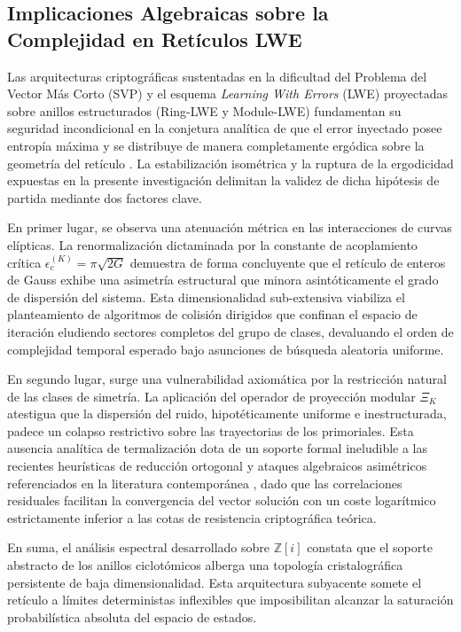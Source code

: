 \documentclass{article}
\numberwithin{equation}{section}
\theoremstyle{plain}
\theoremstyle{definition}
\begin{document}
\subsection{Implicaciones Algebraicas sobre la Complejidad en Retículos LWE}

Las arquitecturas criptográficas sustentadas en la dificultad del Problema del Vector Más Corto (SVP) y el esquema \textit{Learning With Errors} (LWE) proyectadas sobre anillos estructurados (Ring-LWE y Module-LWE) fundamentan su seguridad incondicional en la conjetura analítica de que el error inyectado posee entropía máxima y se distribuye de manera completamente ergódica sobre la geometría del retículo \cite{Peikert2009, Regev2009}. La estabilización isométrica y la ruptura de la ergodicidad expuestas en la presente investigación delimitan la validez de dicha hipótesis de partida mediante dos factores clave.

En primer lugar, se observa una atenuación métrica en las interacciones de curvas elípticas. La renormalización dictaminada por la constante de acoplamiento crítica $\epsilon_c^{(K)} = \pi\sqrt{2G}$ demuestra de forma concluyente que el retículo de enteros de Gauss exhibe una asimetría estructural que minora asintóticamente el grado de dispersión del sistema. Esta dimensionalidad sub-extensiva viabiliza el planteamiento de algoritmos de colisión dirigidos que confinan el espacio de iteración eludiendo sectores completos del grupo de clases, devaluando el orden de complejidad temporal esperado bajo asunciones de búsqueda aleatoria uniforme.

En segundo lugar, surge una vulnerabilidad axiomática por la restricción natural de las clases de simetría. La aplicación del operador de proyección modular $\Xi_K$ atestigua que la dispersión del ruido, hipotéticamente uniforme e inestructurada, padece un colapso restrictivo sobre las trayectorias de los primoriales. Esta ausencia analítica de termalización dota de un soporte formal ineludible a las recientes heurísticas de reducción ortogonal y ataques algebraicos asimétricos referenciados en la literatura contemporánea \cite{Wenger2024}, dado que las correlaciones residuales facilitan la convergencia del vector solución con un coste logarítmico estrictamente inferior a las cotas de resistencia criptográfica teórica.

En suma, el análisis espectral desarrollado sobre $\mathbb{Z}[i]$ constata que el soporte abstracto de los anillos ciclotómicos alberga una topología cristalográfica persistente de baja dimensionalidad. Esta arquitectura subyacente somete el retículo a límites deterministas inflexibles que imposibilitan alcanzar la saturación probabilística absoluta del espacio de estados.
\end{document}
